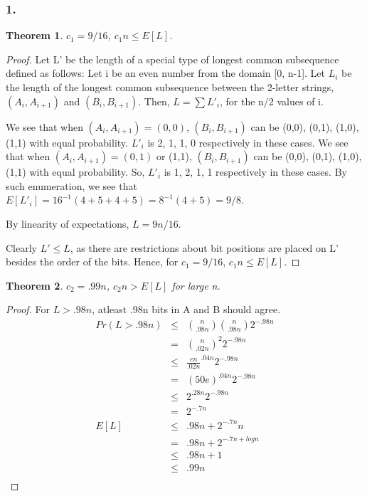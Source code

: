\documentclass[10pt]{amsart}
\newtheorem{thm}{Theorem}[subsection]
\theoremstyle{remark}
\begin{document}
\subsubsection{1.}
\begin{thm}
$c_{1}=9/16$, $c_{1}n \leq E[L]$.
\end{thm}
\begin{proof}
Let L' be the length of a special type of longest common subsequence defined as follows: Let i be an even number from the domain [0, n-1]. Let $L_{i}$ be the length of the longest common subsequence between the 2-letter strings, $(A_{i}, A_{i+1})$ and $(B_{i}, B_{i+1})$. Then, $L = \sum L'_{i}$, for the n/2 values of i.

We see that when $(A_{i}, A_{i+1}) = (0,0)$, $(B_{i}, B_{i+1})$ can be (0,0), (0,1), (1,0), (1,1) with equal probability. $L'_{i}$ is 2, 1, 1, 0 respectively in these cases. We see that when $(A_{i}, A_{i+1}) = (0,1)$ or (1,1), $(B_{i}, B_{i+1})$ can be (0,0), (0,1), (1,0), (1,1) with equal probability. So, $L'_{i}$ is 1, 2, 1, 1 respectively in these cases. By such enumeration, we see that $E[L'_{i}] = 16^{-1}(4 + 5 + 4 + 5) = 8^{-1}(4 + 5) = 9/8$.

By linearity of expectations, $L = 9n/16$.

Clearly $L' \leq L$, as there are restrictions about bit positions are placed on L' besides the order of the bits. Hence, for $c_{1}=9/16$, $c_{1}n \leq E[L]$.
\end{proof}

\begin{thm}
$c_{2}=.99n$, $c_{2}n > E[L]$ for large n.
\end{thm}
\begin{proof}
For $L > .98n$, atleast .98n bits in A and B should agree.
\begin{eqnarray}
Pr(L > .98n) &\leq& \binom{n}{.98n} \binom{n}{.98n} 2^{-.98n}\\
&=& \binom{n}{.02n}^{2} 2^{-.98n}\\
&\leq& \frac{en}{.02n}^{.04n} 2^{-.98n}\\
&=& (50e)^{.04n} 2^{-.98n}\\
&\leq& 2^{.28n} 2^{-.98n}\\
&=& 2^{-.7n}\\
E[L] &\leq& .98n + 2^{-.7n} n\\
&=& .98n + 2^{-.7n + log n} \\
&\leq& .98n + 1\\
&\leq& .99n\\
\end{eqnarray} 
\end{proof}
\end{document}
